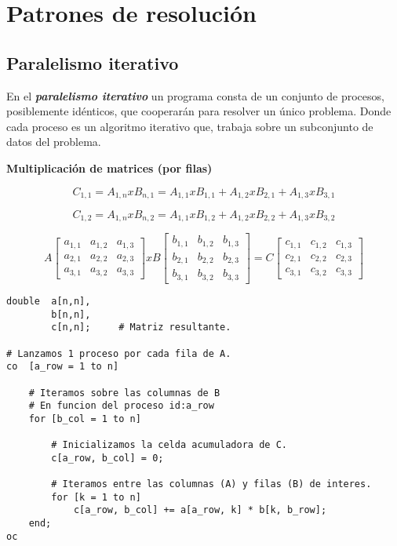 \documentclass[a4paper, 10pt]{report}
\begin{document}
\section{Patrones de resolución}

\subsection{Paralelismo iterativo}

En el \textbf{\emph{paralelismo iterativo}} un programa consta de un conjunto de procesos, posiblemente idénticos, que cooperarán para resolver un único problema. Donde cada proceso es un algoritmo iterativo que, trabaja sobre un subconjunto de datos del problema.

\textbf{Multiplicación de matrices (por filas)}

\begin{equation}
    C_{1,1} = A_{1,n} x B_{n,1} = A_{1,1} x B_{1,1} + A_{1,2} x B_{2,1} + A_{1,3} x B_{3,1}
\end{equation}

\begin{equation}
    C_{1,2} = A_{1,n} x B_{n,2} = A_{1,1} x B_{1,2} + A_{1,2} x B_{2,2} + A_{1,3} x B_{3,2}
\end{equation}

\begin{equation}
A\begin{bmatrix}
a_{1,1} & a_{1,2} & a_{1,3}\\
a_{2,1} & a_{2,2} & a_{2,3}\\
a_{3,1} & a_{3,2} & a_{3,3}
\end{bmatrix}
x
B\begin{bmatrix}
b_{1,1} & b_{1,2} & b_{1,3}\\
b_{2,1} & b_{2,2} & b_{2,3}\\
b_{3,1} & b_{3,2} & b_{3,3}
\end{bmatrix}
=
C\begin{bmatrix}
c_{1,1} & c_{1,2} & c_{1,3}\\
c_{2,1} & c_{2,2} & c_{2,3}\\
c_{3,1} & c_{3,2} & c_{3,3}
\end{bmatrix}
\end{equation}


\begin{lstlisting}
double  a[n,n],
        b[n,n],
        c[n,n];     # Matriz resultante.

# Lanzamos 1 proceso por cada fila de A.
co  [a_row = 1 to n]

    # Iteramos sobre las columnas de B
    # En funcion del proceso id:a_row
    for [b_col = 1 to n]
        
        # Inicializamos la celda acumuladora de C.
        c[a_row, b_col] = 0;

        # Iteramos entre las columnas (A) y filas (B) de interes.
        for [k = 1 to n]
            c[a_row, b_col] += a[a_row, k] * b[k, b_row];
    end;
oc 
\end{lstlisting}
\end{document}
